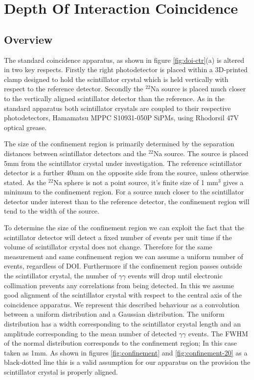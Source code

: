 \section{Depth Of Interaction Coincidence}
\subsection{Overview}
The standard coincidence apparatus, as shown in figure \ref{fig:doi-ctr}(a) is altered in two key respects. Firstly the right photodetector is placed within a 3D-printed clamp designed to hold the scintillator crystal which is held vertically with respect to the reference detector. Secondly the $^{22}$Na source is placed much closer to the vertically aligned scintillator detector than the reference. As in the standard apparatus both scintillator crystals are coupled to their respective photodetectors, Hamamatsu MPPC S10931-050P SiPMs, using Rhodorsil 47V optical grease. 

The size of the confinement region is primarily determined by the separation distances between scintillator detectors and the $^{22}$Na source. The source is placed 5mm from the scintillator crystal under investigation. The reference scintillator detector is a further 40mm on the opposite side from the source, unless otherwise stated. As the $^{22}$Na sphere is not a point source, it's finite size of 1 mm$^3$ gives a minimum to the confinement region. For a source much closer to the scintillator detector under interest than to the reference detector, the confinement region will tend to the width of the source. 

To determine the size of the confinement region we can exploit the fact that the scintillator detector will detect a fixed number of events per unit time if the volume of scintillator crystal does not change. Therefore for the same measurement and same confinement region we can assume a uniform number of events, regardless of DOI. Furthermore if the confinement region passes outside the scintillator crystal, the number of $\gamma\gamma$ events will drop until electronic collimation prevents any correlations from being detected. In this we assume good alignment of the scintillator crystal with respect to the central axis of the coincidence apparatus. We represent this described behaviour as a convolution between a uniform distribution and a Gaussian distribution. The uniform distribution has a width corresponding to the scintillator crystal length and an amplitude corresponding to the mean number of detected $\gamma\gamma$ events. The FWHM of the normal distribution corresponds to the confinement region; In this case taken as 1mm. As shown in figures \ref{fig:confinement} and \ref{fig:confinement-20} as a black-dotted line this is a valid assumption for our apparatus on the provision the scintillator crystal is properly aligned.

